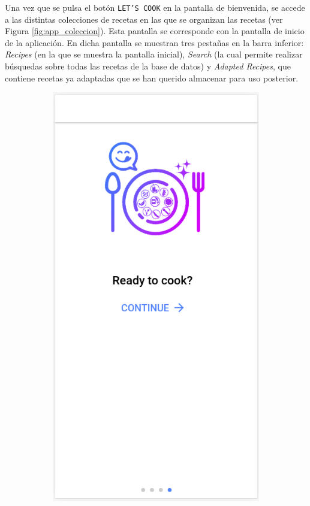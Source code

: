 Una vez que se pulsa el botón \texttt{LET'S COOK} en la pantalla de bienvenida, se accede a las distintas colecciones de recetas en las que se organizan las recetas (ver Figura \ref{fig:app_coleccion}). Esta pantalla se corresponde con la pantalla de inicio de la aplicación. En dicha pantalla se muestran tres pestañas en la barra inferior: \textit{Recipes} (en la que se muestra la pantalla inicial), \textit{Search} (la cual permite realizar búsquedas sobre todas las recetas de la base de datos) y \textit{Adapted Recipes}, que contiene recetas ya adaptadas que se han querido almacenar para uso posterior.

\begin{figure}[H]
    \centering
    \begin{subfigure}[b]{0.32\linewidth}
        \includegraphics[width=\linewidth]{imagenes/app/pantallas/app_tutorial4.png}

\end{subfigure}
\end{figure}
